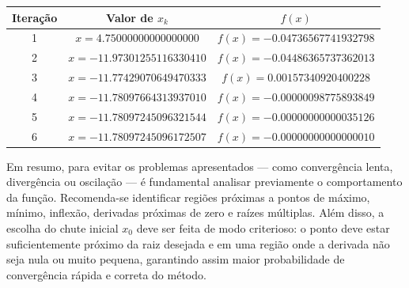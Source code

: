 \begin{center}
\small
\begin{tabular}{|c|c|c|}
\hline
Iteração & Valor de $x_k$ & $f(x)$ \\
\hline
1 & $x = 4.75000000000000000$ & $f(x) = -0.04736567741932798$ \\
\hline
2 & $x = -11.97301255116330410$ & $f(x) = -0.04486365737362013$ \\
\hline
3 & $x = -11.77429070649470333$ & $f(x) = 0.00157340920400228$ \\
\hline
4 & $x = -11.78097664313937010$ & $f(x) = -0.00000098775893849$ \\
\hline
5 & $x = -11.78097245096321544$ & $f(x) = -0.00000000000035126$ \\
\hline
6 & $x = -11.78097245096172507$ & $f(x) = -0.00000000000000010$ \\
\hline
\end{tabular}
\label{tab:ciladaNRDerivadaProximaZero}
\end{center}
Em resumo, para evitar os problemas apresentados — como convergência lenta, divergência ou oscilação — é fundamental analisar previamente o comportamento da função. Recomenda-se identificar regiões próximas a pontos de máximo, mínimo, inflexão, derivadas próximas de zero e raízes múltiplas. Além disso, a escolha do chute inicial $x_0$ deve ser feita de modo criterioso: o ponto deve estar suficientemente próximo da raiz desejada e em uma região onde a derivada não seja nula ou muito pequena, garantindo assim maior probabilidade de convergência rápida e correta do método.

